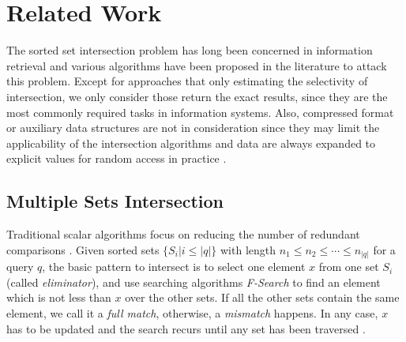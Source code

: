 \documentclass[runningheads,a4paper]{llncs}
\begin{document}
\section{Related Work}\label{sec:related work}
The sorted set intersection problem has long been concerned in information retrieval and various algorithms have been proposed in the literature to attack this problem.
Except for approaches that only estimating the selectivity of intersection, we only consider those return the exact results, since they are the most commonly required tasks in information systems.
Also, compressed format or auxiliary data structures are not in consideration since they may limit the applicability of the intersection algorithms and data are always expanded to explicit values for random access in practice \cite{Culpepper2007Compact,Sanders2007Intersection}.
\subsection{Multiple Sets Intersection}\label{sec: msis}
Traditional scalar algorithms focus on reducing the number of redundant comparisons \cite{Demaine2001Experiments,Barbay2006Faster,Inoue2014Faster,Schlegel2011Fast}.
Given sorted sets $ \{S_i|i\leqslant\lvert q \rvert\} $ with length $ n_1\leqslant n_2\leqslant\cdots\leqslant n_{\lvert q\rvert} $ for a query $ q $, the basic pattern to intersect is to select one element $ x $ from one set $ S_i $ (called \textit{eliminator}), and use searching algorithms \textit{F-Search} to find an element which is not less than $ x $ over the other sets.
If all the other sets contain the same element, we call it a \textit{full match}, otherwise, a \textit{mismatch} happens.
In any case, $ x $ has to be updated and the search recurs until any set has been traversed \cite{culpepper2010efficient}.
\end{document}
